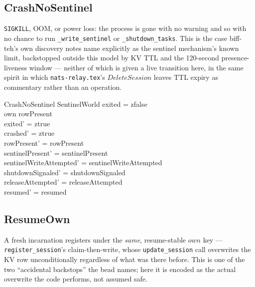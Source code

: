 \documentclass[a4paper,10pt,fleqn]{article}
\begin{document}
\subsection{CrashNoSentinel}
\label{sec:crash}

\texttt{SIGKILL}, OOM, or power loss: the process is gone with no
warning and so with no chance to run \texttt{\_write\_sentinel} or
\texttt{\_shutdown\_tasks}.  This is the case biff-teh's own discovery
notes name explicitly as the sentinel mechanism's known limit, backstopped
outside this model by KV TTL and the 120-second presence-liveness window
--- neither of which is given a live transition here, in the same spirit
in which \texttt{nats-relay.tex}'s $DeleteSession$ leaves TTL expiry as
commentary rather than an operation.

\begin{schema}{CrashNoSentinel}
  \Delta SentinelWorld
  \where
  exited = zfalse \\
  own \in rowPresent \\
  exited' = ztrue \\
  crashed' = ztrue \\
  rowPresent' = rowPresent \\
  sentinelPresent' = sentinelPresent \\
  sentinelWriteAttempted' = sentinelWriteAttempted \\
  shutdownSignaled' = shutdownSignaled \\
  releaseAttempted' = releaseAttempted \\
  resumed' = resumed
\end{schema}

\subsection{ResumeOwn}

A fresh incarnation registers under the \emph{same}, resume-stable
$own$ key --- \texttt{register\_session}'s claim-then-write, whose
\texttt{update\_session} call overwrites the KV row unconditionally
regardless of what was there before.  This is one of the two
``accidental backstops'' the bead names; here it is encoded as the
actual overwrite the code performs, not assumed safe.
\end{document}
